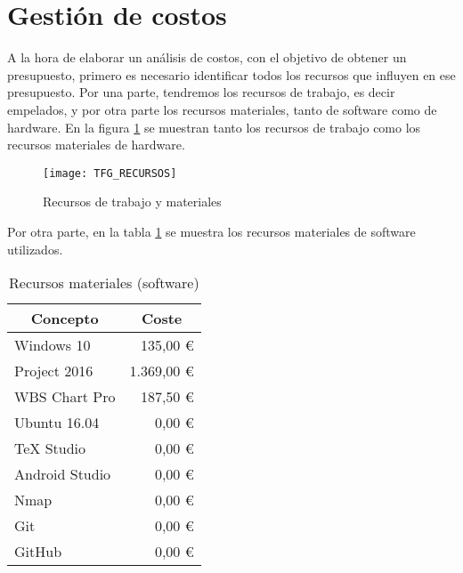 

\section{Gestión de costos}
A la hora de elaborar un análisis de costos, con el objetivo de obtener un presupuesto, primero es necesario identificar todos los recursos que influyen en ese presupuesto. Por una parte, tendremos los recursos de trabajo, es decir empelados, y por otra parte los recursos materiales, tanto de software como de hardware. En la figura \ref{fig:recursos} se muestran tanto los recursos de trabajo como los recursos materiales de hardware.

\begin{figure}[H]
	\centering
	\texttt{[image: TFG\_RECURSOS]}
	\caption{Recursos de trabajo y materiales}
	\label{fig:recursos}
\end{figure}

Por otra parte, en la tabla \ref{table:software} se muestra los recursos materiales de software utilizados.

\begin{table}[H]
	\centering
	\begin{tabular}{ |l|r| } 
		\hline
		\multicolumn{1}{|c|}{Concepto} & 
			\multicolumn{1}{|c|}{Coste} \\
		\hline
		Windows 10 		& 135,00 \euro \cite{precio-win10}		\\
		Project 2016 	& 1.369,00 \euro \cite{precio-project}	\\
		WBS Chart Pro 	& 187,50 \euro \cite{precio-wbs}		\\
		Ubuntu 16.04 	& 0,00 \euro							\\
		TeX Studio 		& 0,00 \euro							\\
		Android Studio 	& 0,00 \euro							\\
		Nmap 			& 0,00 \euro							\\
		Git 			& 0,00 \euro							\\
		GitHub 			& 0,00 \euro							\\
		\hline
	\end{tabular}
	\caption{Recursos materiales (software)}
	\label{table:software}
\end{table}


